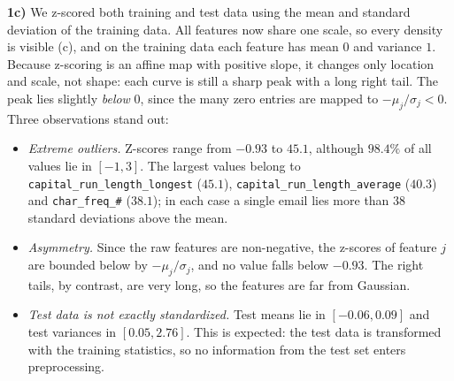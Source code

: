 \documentclass[a4paper,oneside,bibliography=totoc]{scrartcl}
\begin{document}
\begin{answer}[19.5cm]
  \textbf{1c)} We z-scored both training and test data using the mean and standard deviation of the
  training data. All features now share one scale, so every density is visible (c), and on the training data
  each feature has mean $0$ and variance $1$. Because z-scoring is an affine map with positive slope, it
  changes only location and scale, not shape: each curve is still a sharp peak with a long right tail. The
  peak lies slightly \emph{below} $0$, since the many zero entries are mapped to $-\mu_j/\sigma_j<0$. Three
  observations stand out:
  \begin{itemize}
    \item \emph{Extreme outliers.} Z-scores range from $-0.93$ to $45.1$, although $98.4\%$ of all values lie
          in $[-1,3]$. The largest values belong to \texttt{capital\_run\_length\_longest} ($45.1$),
          \texttt{capital\_run\_length\_average} ($40.3$) and \texttt{char\_freq\_\#} ($38.1$); in each case a
          single email lies more than $38$ standard deviations above the mean.
    \item \emph{Asymmetry.} Since the raw features are non-negative, the z-scores of feature $j$ are bounded
          below by $-\mu_j/\sigma_j$, and no value falls below $-0.93$. The right tails, by contrast, are very
          long, so the features are far from Gaussian.
    \item \emph{Test data is not exactly standardized.} Test means lie in $[-0.06,0.09]$ and test variances in
          $[0.05,2.76]$. This is expected: the test data is transformed with the training statistics, so no
          information from the test set enters preprocessing.
  \end{itemize}
\end{answer}
\end{document}
